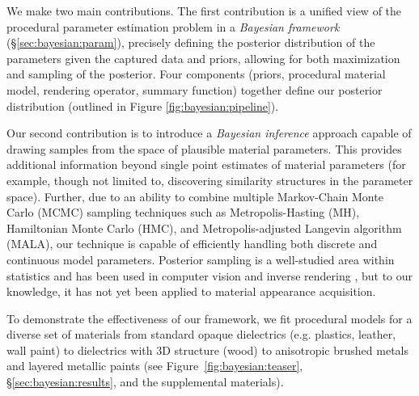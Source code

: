 We make two main contributions. The first contribution is a unified view of the procedural parameter estimation problem in a \emph{Bayesian framework} (\S\ref{sec:bayesian:param}), precisely defining the posterior distribution of the parameters given the captured data and priors, allowing for both maximization and sampling of the posterior. Four components (priors, procedural material model, rendering operator, summary function) together define our posterior distribution (outlined in Figure \ref{fig:bayesian:pipeline}). 



Our second contribution is to introduce a \emph{Bayesian inference} approach capable of drawing samples from the space of plausible material parameters.
This provides additional information beyond single point estimates of material parameters (for example, though not limited to, discovering similarity structures in the parameter space).
Further, due to an ability to combine multiple Markov-Chain Monte Carlo (MCMC) sampling techniques such as Metropolis-Hasting (MH), Hamiltonian Monte Carlo (HMC), and Metropolis-adjusted Langevin algorithm (MALA), our technique is capable of efficiently handling both discrete and continuous model parameters.
Posterior sampling is a well-studied area within statistics and has been used in computer vision and inverse rendering \cite{kulkarni2015picture}, but to our knowledge, it has not yet been applied to material appearance acquisition.

To demonstrate the effectiveness of our framework, we fit procedural models for a diverse set of materials from standard opaque dielectrics (e.g. plastics, leather, wall paint) to dielectrics with 3D structure (wood) to anisotropic brushed metals and layered metallic paints (see Figure~\ref{fig:bayesian:teaser}, \S\ref{sec:bayesian:results}, and the supplemental materials).

